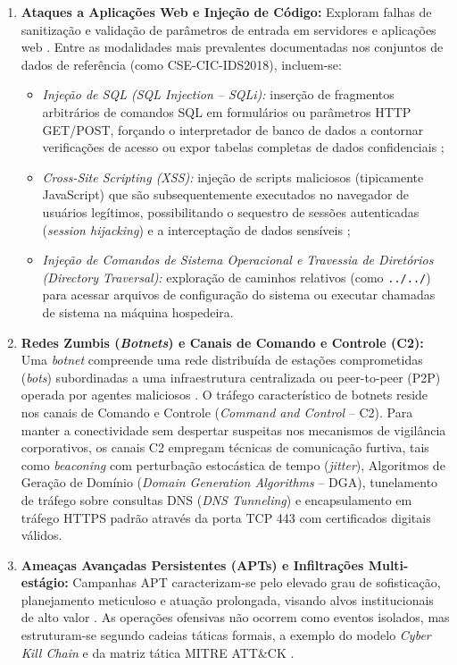 \begin{enumerate}
    \item \textbf{Ataques a Aplicações Web e Injeção de Código:}
    Exploram falhas de sanitização e validação de parâmetros de entrada em servidores e aplicações web \cite{webattacks2024, webattacks2024b}. Entre as modalidades mais prevalentes documentadas nos conjuntos de dados de referência (como CSE-CIC-IDS2018), incluem-se:
    \begin{itemize}
        \item \emph{Injeção de SQL (SQL Injection -- SQLi):} inserção de fragmentos arbitrários de comandos SQL em formulários ou parâmetros HTTP GET/POST, forçando o interpretador de banco de dados a contornar verificações de acesso ou expor tabelas completas de dados confidenciais \cite{webattacks2024};
        \item \emph{Cross-Site Scripting (XSS):} injeção de scripts maliciosos (tipicamente JavaScript) que são subsequentemente executados no navegador de usuários legítimos, possibilitando o sequestro de sessões autenticadas (\emph{session hijacking}) e a interceptação de dados sensíveis \cite{webattacks2024b};
        \item \emph{Injeção de Comandos de Sistema Operacional e Travessia de Diretórios (\emph{Directory Traversal}):} exploração de caminhos relativos (como \texttt{../../}) para acessar arquivos de configuração do sistema ou executar chamadas de sistema na máquina hospedeira.
    \end{itemize}

    \item \textbf{Redes Zumbis (\emph{Botnets}) e Canais de Comando e Controle (C2):}
    Uma \emph{botnet} compreende uma rede distribuída de estações comprometidas (\emph{bots}) subordinadas a uma infraestrutura centralizada ou peer-to-peer (P2P) operada por agentes maliciosos \cite{Sharafaldin2018TowardGA}. O tráfego característico de botnets reside nos canais de Comando e Controle (\emph{Command and Control} -- C2). Para manter a conectividade sem despertar suspeitas nos mecanismos de vigilância corporativos, os canais C2 empregam técnicas de comunicação furtiva, tais como \emph{beaconing} com perturbação estocástica de tempo (\emph{jitter}), Algoritmos de Geração de Domínio (\emph{Domain Generation Algorithms} -- DGA), tunelamento de tráfego sobre consultas DNS (\emph{DNS Tunneling}) e encapsulamento em tráfego HTTPS padrão através da porta TCP 443 com certificados digitais válidos.

    \item \textbf{Ameaças Avançadas Persistentes (APTs) e Infiltrações Multi-estágio:}
    Campanhas APT caracterizam-se pelo elevado grau de sofisticação, planejamento meticuloso e atuação prolongada, visando alvos institucionais de alto valor \cite{deepstage2026}. As operações ofensivas não ocorrem como eventos isolados, mas estruturam-se segundo cadeias táticas formais, a exemplo do modelo \emph{Cyber Kill Chain} e da matriz tática MITRE ATT\&CK \cite{stix2026}. 
    

\end{enumerate}
